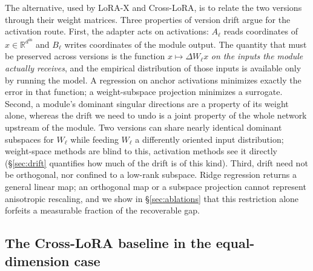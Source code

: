 The alternative, used by LoRA-X and Cross-LoRA, is to relate the two versions
through their weight matrices. Three properties of version drift argue for
the activation route.
First, the adapter acts on activations: $A_\ell$ reads coordinates of
$x\in\mathbb{R}^{d^{\mathrm{in}}}$ and $B_\ell$ writes coordinates of the module
output. The quantity that must be preserved across versions is the function
$x\mapsto\Delta W_\ell x$ \emph{on the inputs the module actually receives},
and the empirical distribution of those inputs is available only by running
the model. A regression on anchor activations minimizes exactly the error in
that function; a weight-subspace projection minimizes a surrogate.
Second, a module's dominant singular directions are a property of its weight
alone, whereas the drift we need to undo is a joint property of the whole
network upstream of the module. Two versions can share nearly identical
dominant subspaces for $W_\ell$ while feeding $W_\ell$ a differently oriented
input distribution; weight-space methods are blind to this, activation methods
see it directly (\S\ref{sec:drift} quantifies how much of the drift is of this
kind).
Third, drift need not be orthogonal, nor confined to a low-rank subspace.
Ridge regression returns a general linear map; an orthogonal map or a
subspace projection cannot represent anisotropic rescaling, and we show in
\S\ref{sec:ablations} that this restriction alone forfeits a measurable
fraction of the recoverable gap.

\subsection{The Cross-LoRA baseline in the equal-dimension case}
\label{sec:method:crosslora}

